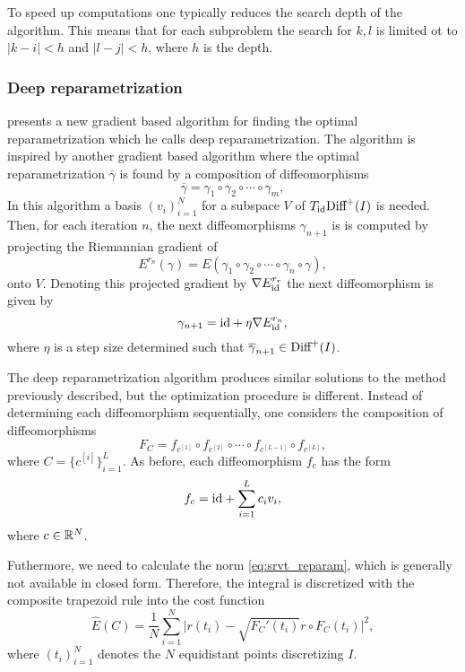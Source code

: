 To speed up computations one typically reduces the search depth of the algorithm. This means that for each subproblem the search for \(k,l\) is limited ot to \(|k-i|<h\) and \(|l-j| < h \), where \(h\) is the depth.  

\subsubsection{Deep reparametrization}
\citeauthor{jørgen2021} \cite{jørgen2021} presents a new gradient based algorithm for finding the optimal reparametrization which he calls deep reparametrization. The algorithm is inspired by another gradient based algorithm where the optimal reparametrization \(\overline \gamma\) is found by a composition of diffeomorphisms
\begin{equation*}
  \overline \gamma = \gamma_1 \circ \gamma_2 \circ \cdots  \circ \gamma_m, 
\end{equation*}
In this algorithm a basis \({(v_i)}_{i=1}^{N}\) for a subspace \(V\) of \( T_{\text{id}}\text{Diff}^+(I)\) is needed. Then, for each iteration \(n\), the next diffeomorphisms \(\gamma_{n+1}\) is is computed by projecting the Riemannian gradient of 
\begin{equation*}
  E^{r_n}(\gamma) = E(\gamma_1 \circ \gamma_2 \circ \cdots  \circ \gamma_n \circ \gamma),   
\end{equation*}
onto \(V\). Denoting this projected gradient by \(\nabla E_{\text{id}}^{r_r}\) the next diffeomorphism is given by 
\begin{equation*}
  \gamma_{n+1} = \text{id} + \eta \nabla E_{\text{id}}^{r_n}, 
\end{equation*}
where \(\eta\) is a step size determined such that \(\overline \gamma_{n+1} \in \text{Diff}^+(I)\).

The deep reparametrization algorithm produces similar solutions to the method previously described, but the optimization procedure is different. Instead of determining each diffeomorphism sequentially, one considers the composition of diffeomorphisms 
\begin{equation*}
  F_{C} = f_{c^{[1]}}\circ f_{c^{[2]}} \circ \cdots \circ f_{c^{[L-1]}} \circ f_{c^{[L]}},
\end{equation*}
where \(C = \{c^{[i]}\}^{L}_{i=1}\). As before, each diffeomorphism \(f_{c}\) has the form 
\begin{equation*}
  f_{c}= \text{id} +  \sum_{i=1}^{L} c_i v_i, 
\end{equation*}
where \(c \in \mathbb{R}^N \). 

Futhermore, we need to calculate the norm \eqref{eq:srvt_reparam}, which is generally not available in closed form. Therefore, the integral is discretized with the composite trapezoid rule into the cost function 
\begin{equation}\label{eq:discretized_cost}
  \hat E(C) = \frac{1}{N} \sum_{i = 1}^N {\vert r(t_i)- \sqrt{ F_C'(t_i)}r \circ F_C(t_i) \vert^2}, 
\end{equation}
where \({(t_i)}_{i=1}^N\) denotes the \(N\) equidistant points discretizing \(I\). 

